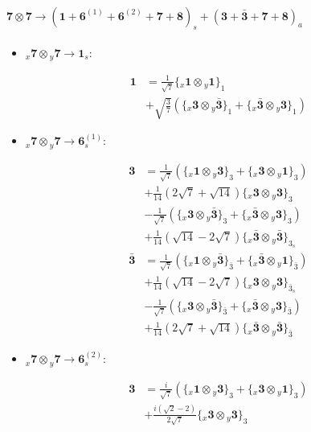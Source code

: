 \documentclass[english]{article}
\newcommand{\cgEqFontsize}{\large}
\newcommand{\rep}[1]{\mathbf{#1}}
\newcommand{\repx}[2]{{}_{#2}\mathbf{#1}}
\newcommand{\tsprod}[2]{\rep{#1}\otimes\rep{#2}}
\newcommand{\tsprodx}[2]{\repx{#1}{x}\otimes\repx{#2}{y}}
\newcommand{\subcgt}[3]{\big\{ \tsprodx{#1}{#2}\big\}^{}_{#3}}
\begin{document}
\paragraph*{\cgEqFontsize $\tsprod{7}{7}\to\left(\rep{1}+\rep{6}^{(1)}+\rep{6}^{(2)}+\rep{7}+\rep{8}\right)_s+\left(\rep{3}+\rep{\bar{3}}+\rep{7}+\rep{8}\right)_a$}
\begin{itemize}
\item $\tsprodx{7}{7}\to\rep{1}_{s}$:
\begin{fleqn}
\begin{align*}
\rep{1} & = \frac{1}{\sqrt{7}}\subcgt{1}{1}{1} \\ 
 & +\sqrt{\frac{3}{7}}\left(\subcgt{3}{\bar{3}}{1}+\subcgt{\bar{3}}{3}{1}\right)
\end{align*}
\end{fleqn}
\item $\tsprodx{7}{7}\to\rep{6}_{s}^{(1)}$:
\begin{fleqn}
\begin{align*}
\rep{3} & = \frac{1}{\sqrt{7}}\left(\subcgt{1}{3}{3}+\subcgt{3}{1}{3}\right) \\ 
 & +\frac{1}{14} \left(2 \sqrt{7}+\sqrt{14}\right)\subcgt{3}{3}{3} \\ 
 & -\frac{1}{\sqrt{7}}\left(\subcgt{3}{\bar{3}}{3}+\subcgt{\bar{3}}{3}{3}\right) \\ 
 & +\frac{1}{14} \left(\sqrt{14}-2 \sqrt{7}\right)\subcgt{\bar{3}}{\bar{3}}{3_{s}}
\end{align*}
\begin{align*}
\rep{\bar{3}} & = \frac{1}{\sqrt{7}}\left(\subcgt{1}{\bar{3}}{\bar{3}}+\subcgt{\bar{3}}{1}{\bar{3}}\right) \\ 
 & +\frac{1}{14} \left(\sqrt{14}-2 \sqrt{7}\right)\subcgt{3}{3}{\bar{3}_{s}} \\ 
 & -\frac{1}{\sqrt{7}}\left(\subcgt{3}{\bar{3}}{\bar{3}}+\subcgt{\bar{3}}{3}{\bar{3}}\right) \\ 
 & +\frac{1}{14} \left(2 \sqrt{7}+\sqrt{14}\right)\subcgt{\bar{3}}{\bar{3}}{\bar{3}}
\end{align*}
\end{fleqn}
\item $\tsprodx{7}{7}\to\rep{6}_{s}^{(2)}$:
\begin{fleqn}
\begin{align*}
\rep{3} & = \frac{i}{\sqrt{7}}\left(\subcgt{1}{3}{3}+\subcgt{3}{1}{3}\right) \\ 
 & +\frac{i \left(\sqrt{2}-2\right)}{2 \sqrt{7}}\subcgt{3}{3}{3} \\ 

\end{align*}
\end{fleqn}
\end{itemize}
\end{document}

